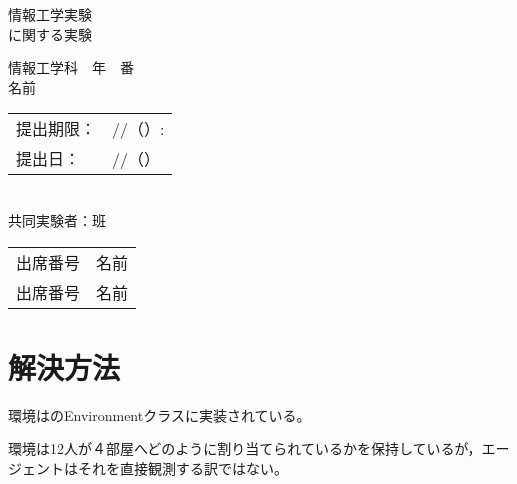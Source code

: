 \documentclass[titlepage]{ltjsreport}
\begin{document}
\makeatletter
\let\c@lstlisting=\c@figure
\makeatother
\begin{titlepage}
\vspace*{1em}
\begin{center}
\begin{huge}
情報工学実験
\\
\vspace{1em}
に関する実験
\end{huge}
\end{center}
\vspace{6em}
\begin{flushright}
\begin{LARGE}
情報工学科　年　番
\\
\vspace{1em}
名前
\end{LARGE}
\end{flushright}
\vspace{4em}
\begin{flushleft}
\begin{Large}
\begin{tabular}{ll}
提出期限： & //（）:
\\
提出日： & //（）
\\
\end{tabular}
\\
\vspace{2em}
共同実験者：班
\\
\vspace{1em}
\begin{tabular}{ll}
出席番号 & 名前
\\
出席番号 & 名前
\\
\end{tabular}
\end{Large}
\end{flushleft}
\end{titlepage}
\begin{abstract}
\end{abstract}
\chapter{解決方法}
環境は\cite{環境}のEnvironmentクラスに実装されている。

環境は12人が４部屋へどのように割り当てられているかを保持しているが，エージェントはそれを直接観測する訳ではない。
\end{document}
